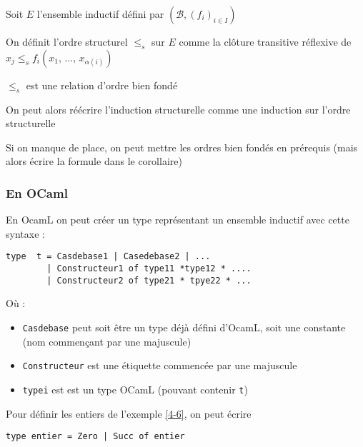\begin{definition}
	Soit $E$ l'ensemble inductif défini par $(\mathcal B, (f_i)_{i \in I})$
	
	On définit l'ordre structurel $\leq_s$ sur $E$ comme la clôture transitive réflexive de $x_j \leq_s f_i(x_1, \, \dots, \, x_{\alpha(i)})$
\end{definition}

\begin{proposition}
	$\leq_s$ est une relation d'ordre bien fondé
\end{proposition}

\begin{corollary}
	On peut alors réécrire l'induction structurelle comme une induction sur l'ordre structurelle
\end{corollary}

\begin{com}
	Si on manque de place, on peut mettre les ordres bien fondés en prérequis (mais alors écrire la formule dans le corollaire)
\end{com}

\subsubsection{En OCaml}

\begin{syntaxe}
	En OcamL on peut créer un type représentant un ensemble inductif avec cette syntaxe :
	\begin{lstlisting}
type  t = Casdebase1 | Casedebase2 | ... 
        | Constructeur1 of type11 *type12 * .... 
        | Constructeur2 of type21 * tpye22 * ...
	\end{lstlisting}
	
	Où : \begin{itemize}
		\item \texttt{Casdebase} peut soit être un type déjà défini d'OcamL, soit une constante (nom commençant par une majuscule)
		\item \texttt{Constructeur} est une étiquette commencée par une majuscule 
		\item \texttt{typei} est est un type OCamL (pouvant contenir \texttt t)
	\end{itemize}
\end{syntaxe}

\begin{example}
	Pour définir les entiers de l'exemple \ref{4-6}, on peut écrire \begin{lstlisting}
type entier = Zero | Succ of entier
	\end{lstlisting}
\end{example}

